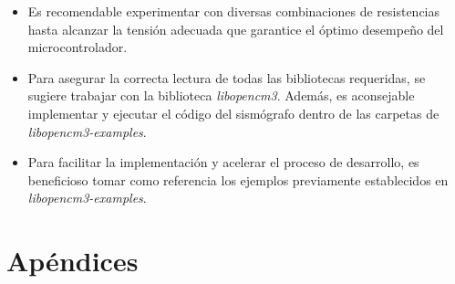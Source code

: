 \documentclass[12pt,a4paper]{article}
\begin{document}
\begin{itemize}

\item Es recomendable experimentar con diversas combinaciones de resistencias hasta alcanzar la tensión adecuada que garantice el óptimo desempeño del microcontrolador.

\item Para asegurar la correcta lectura de todas las bibliotecas requeridas, se sugiere trabajar con la biblioteca \textit{libopencm3}. Además, es aconsejable implementar y ejecutar el código del sismógrafo dentro de las carpetas de \textit{libopencm3-examples}.

\item Para facilitar la implementación y acelerar el proceso de desarrollo, es beneficioso tomar como referencia los ejemplos previamente establecidos en \textit{libopencm3-examples}.


\end{itemize}

\newpage






\newpage

\section{Apéndices}
\appendix
\end{document}
